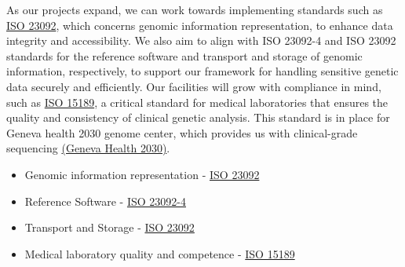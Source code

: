 As our projects expand, we can work towards implementing standards such as \href{https://www.iso.org/standard/67888.html}{ISO 23092}, which concerns genomic information representation, to enhance data integrity and accessibility.
We also aim to align with ISO 23092-4 and ISO 23092 standards for the reference software and transport and storage of genomic information, respectively, to support our framework for handling sensitive genetic data securely and efficiently. 
Our facilities will grow with compliance in mind, such as \href{https://www.iso.org/standard/56115.html}{ISO 15189}, a critical standard for medical laboratories that ensures the quality and consistency of clinical genetic analysis. 
This standard is in place for Geneva health 2030 genome center, which provides us with clinical-grade sequencing \href{https://www.health2030genome.ch/dna-sequencing-platform/}{(Geneva Health 2030)}.
\begin{itemize}
	\item Genomic information representation - \href{https://www.iso.org/standard/67888.html}{ISO 23092}
    \item Reference Software - \href{https://www.iso.org/standard/75859.html}{ISO 23092-4}
    \item Transport and Storage - \href{https://www.iso.org/standard/79882.html}{ISO 23092}
    \item Medical laboratory quality and competence - \href{https://www.iso.org/standard/56115.html}{ISO 15189}
\end{itemize}

